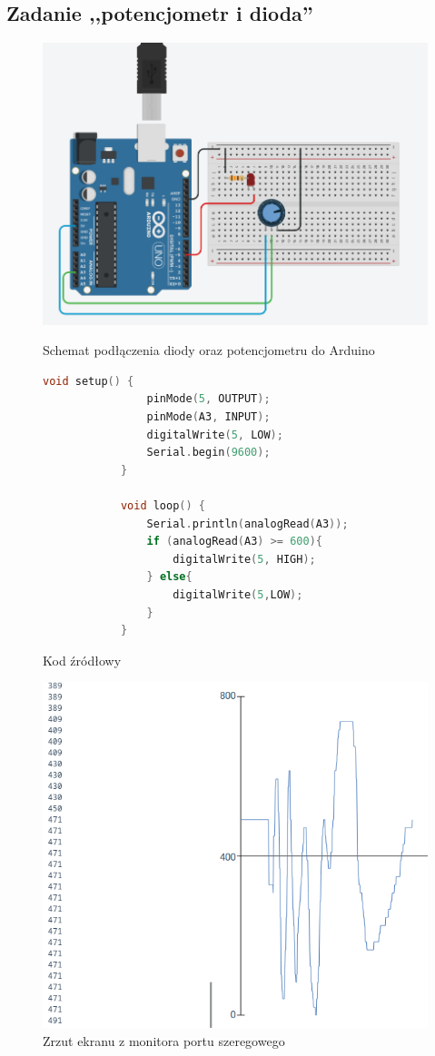 \documentclass[polish,a4paper]{article}
\begin{document}
	\subsection{Zadanie ,,potencjometr i dioda''}
	\begin{figure}[h!]
		\begin{center}
			\includegraphics[scale=0.4]{03_serial_conn.png}
			\caption*{Schemat podłączenia diody oraz potencjometru do Arduino}
		\end{center}
		\begin{lstlisting}[language=C++]
			void setup() {
				pinMode(5, OUTPUT);
				pinMode(A3, INPUT);
				digitalWrite(5, LOW);
				Serial.begin(9600);
			}
			
			void loop() {
				Serial.println(analogRead(A3));
				if (analogRead(A3) >= 600){
					digitalWrite(5, HIGH);
				} else{
					digitalWrite(5,LOW);
				}
			}
		\end{lstlisting}
		\caption*{Kod źródłowy}
		\begin{center}
			\includegraphics[scale=0.45]{Serial.png}
			\caption*{Zrzut ekranu z monitora portu szeregowego}
		\end{center}
	\end{figure}
	
\end{document}
